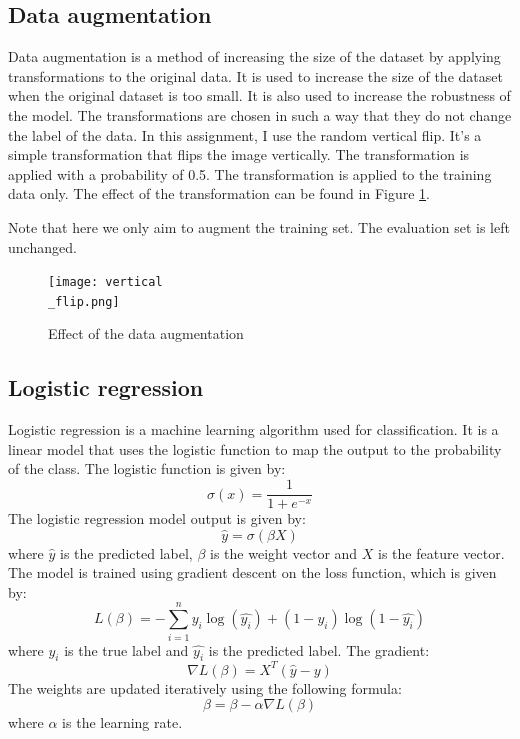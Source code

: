 \documentclass{article}
\begin{document}
\subsection{Data augmentation}
\label{subsec:augmentation}
Data augmentation is a method of increasing the size of the dataset by applying transformations to the original data. It is used to increase the size of the dataset when the original dataset is too small. It is also used to increase the robustness of the model. The transformations are chosen in such a way that they do not change the label of the data. In this assignment, I use the random vertical flip. It's a simple transformation that flips the image vertically. The transformation is applied with a probability of 0.5. The transformation is applied to the training data only. The effect of the transformation can be found in Figure \ref{fig:augmentation}.


Note that here we only aim to augment the training set. The evaluation set is left unchanged.

\begin{figure}[ht]
    \centering
    \texttt{[image: vertical\\\_flip.png]}
    \caption{Effect of the data augmentation}
    \label{fig:augmentation}
\end{figure}

\subsection{Logistic regression}
\label{subsec:logistic_regression}
Logistic regression is a machine learning algorithm used for classification. It is a linear model that uses the logistic function to map the output to the probability of the class. The logistic function is given by:
\begin{equation}
    \sigma(x) = \frac{1}{1 + e^{-x}}
\end{equation}
The logistic regression model output is given by:
\begin{equation}
    \hat{y} = \sigma(\beta X)
\end{equation}
where $\hat{y}$ is the predicted label, $\beta$ is the weight vector and $X$ is the feature vector. The model is trained using gradient descent on the loss function, which is given by:
\begin{equation}
    L(\beta) = -\sum_{i=1}^{n} y_i \log(\hat{y_i}) + (1 - y_i) \log(1 - \hat{y_i})
\end{equation}
where $y_i$ is the true label and $\hat{y_i}$ is the predicted label.
The gradient:
\begin{equation}
    \nabla L(\beta) = X^T(\hat{y} - y)
\end{equation}
The weights are updated iteratively using the following formula:
\begin{equation}
    \beta = \beta - \alpha \nabla L(\beta)
\end{equation}
where $\alpha$ is the learning rate.
\end{document}
